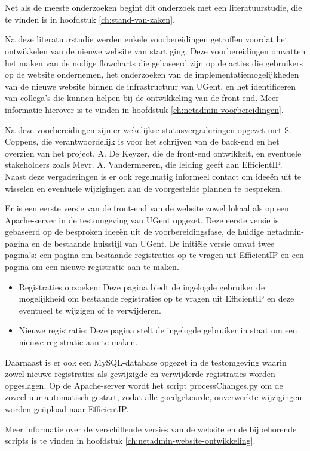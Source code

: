 
\chapter{}%
\label{ch:methodologie}

Net als de meeste onderzoeken begint dit onderzoek met een literatuurstudie, die te vinden is in hoofdstuk \ref{ch:stand-van-zaken}.

Na deze literatuurstudie werden enkele voorbereidingen getroffen voordat het ontwikkelen van de nieuwe website van start ging. Deze voorbereidingen omvatten het maken van de nodige flowcharts die gebaseerd zijn op de acties die gebruikers op de website ondernemen, het onderzoeken van de implementatiemogelijkheden van de nieuwe website binnen de infrastructuur van UGent, en het identificeren van collega's die kunnen helpen bij de ontwikkeling van de front-end. Meer informatie hierover is te vinden in hoofdstuk \ref{ch:netadmin-voorbereidingen}.

Na deze voorbereidingen zijn er wekelijkse statusvergaderingen opgezet met S. Coppens, die verantwoordelijk is voor het schrijven van de back-end en het overzien van het project, A. De Keyzer, die de front-end ontwikkelt, en eventuele stakeholders zoals Mevr. A. Vandermeeren, die leiding geeft aan EfficientIP. Naast deze vergaderingen is er ook regelmatig informeel contact om ideeën uit te wisselen en eventuele wijzigingen aan de voorgestelde plannen te bespreken.

Er is een eerste versie van de front-end van de website zowel lokaal als op een Apache-server in de testomgeving van UGent opgezet. Deze eerste versie is gebaseerd op de besproken ideeën uit de voorbereidingsfase, de huidige netadmin-pagina en de bestaande huisstijl van UGent. De initiële versie omvat twee pagina's: een pagina om bestaande registraties op te vragen uit EfficientIP en een pagina om een nieuwe registratie aan te maken.
\begin{itemize}
    \item Registraties opzoeken: Deze pagina biedt de ingelogde gebruiker de mogelijkheid om bestaande registraties op te vragen uit EfficientIP en deze eventueel te wijzigen of te verwijderen.
    \item Nieuwe registratie: Deze pagina stelt de ingelogde gebruiker in staat om een nieuwe registratie aan te maken.
\end{itemize}

Daarnaast is er ook een MySQL-database opgezet in de testomgeving waarin zowel nieuwe registraties als gewijzigde en verwijderde registraties worden opgeslagen. Op de Apache-server wordt het script processChanges.py om de zoveel uur automatisch gestart, zodat alle goedgekeurde, onverwerkte wijzigingen worden geüpload naar EfficientIP.

Meer informatie over de verschillende versies van de website en de bijbehorende scripts is te vinden in hoofdstuk \ref{ch:netadmin-website-ontwikkeling}.